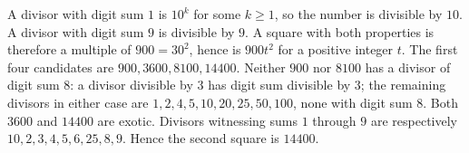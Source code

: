 A divisor with digit sum $1$ is $10^k$ for some $k\ge1$, so the number is divisible by $10$. A divisor with digit sum $9$ is divisible by $9$. A square with both properties is therefore a multiple of $900=30^2$, hence is $900t^2$ for a positive integer $t$.
The first four candidates are $900,3600,8100,14400$. Neither $900$ nor $8100$ has a divisor of digit sum $8$: a divisor divisible by $3$ has digit sum divisible by $3$; the remaining divisors in either case are $1,2,4,5,10,20,25,50,100$, none with digit sum $8$.
Both $3600$ and $14400$ are exotic. Divisors witnessing sums $1$ through $9$ are respectively $10,2,3,4,5,6,25,8,9$. Hence the second square is $\boxed{14400}$.
